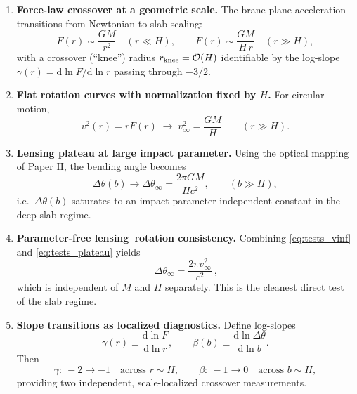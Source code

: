 \documentclass[11pt]{article}
\newcommand{\dd}{\mathrm{d}}
\begin{document}
\begin{enumerate}
\item \textbf{Force-law crossover at a geometric scale.}
The brane-plane acceleration transitions from Newtonian to slab scaling:
\begin{equation}
  F(r)\sim \frac{GM}{r^2}\quad (r\ll H),
  \qquad
  F(r)\sim \frac{GM}{H\,r}\quad (r\gg H),
\end{equation}
with a crossover (``knee'') radius $r_{\rm knee}=\mathcal{O}(H)$ identifiable by the log-slope
$\gamma(r)=\dd\ln F/\dd\ln r$ passing through $-3/2$.

\item \textbf{Flat rotation curves with normalization fixed by $H$.}
For circular motion,
\begin{equation}
  v^2(r)=rF(r)\;\to\; v_\infty^2=\frac{GM}{H}\qquad (r\gg H).
  \label{eq:tests_vinf}
\end{equation}

\item \textbf{Lensing plateau at large impact parameter.}
Using the optical mapping of Paper II, the bending angle becomes
\begin{equation}
  \Delta\theta(b)\to \Delta\theta_\infty = \frac{2\pi GM}{Hc^2},
  \qquad (b\gg H),
  \label{eq:tests_plateau}
\end{equation}
i.e.\ $\Delta\theta(b)$ saturates to an impact-parameter independent constant in the deep slab regime.

\item \textbf{Parameter-free lensing--rotation consistency.}
Combining \eqref{eq:tests_vinf} and \eqref{eq:tests_plateau} yields
\begin{equation}
  \boxed{\ \Delta\theta_\infty = \frac{2\pi v_\infty^2}{c^2}\ },
  \label{eq:tests_consistency}
\end{equation}
which is independent of $M$ and $H$ separately.  This is the cleanest direct test of the slab regime.

\item \textbf{Slope transitions as localized diagnostics.}
Define log-slopes
\begin{equation}
  \gamma(r)\equiv \frac{\dd\ln F}{\dd\ln r},
  \qquad
  \beta(b)\equiv \frac{\dd\ln \Delta\theta}{\dd\ln b}.
\end{equation}
Then
\begin{equation}
  \gamma:\ -2\to -1 \quad \text{across } r\sim H,
  \qquad
  \beta:\ -1\to 0 \quad \text{across } b\sim H,
\end{equation}
providing two independent, scale-localized crossover measurements.
\end{enumerate}
\end{document}
